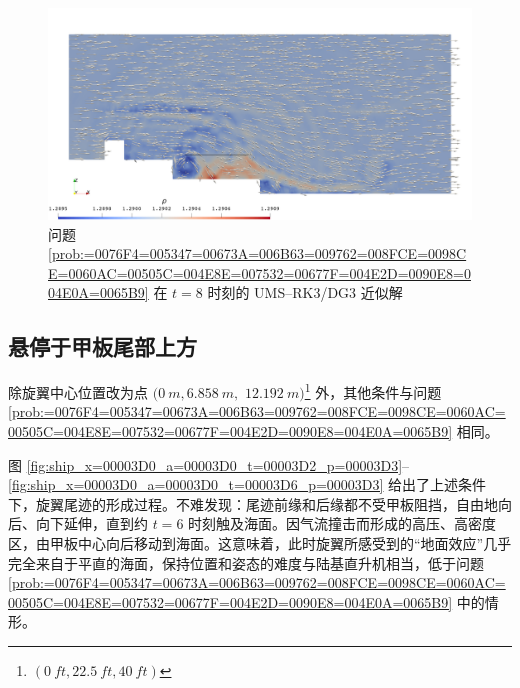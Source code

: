 \begin{figure}[h!]
\begin{centering}
\includegraphics[width=1\textwidth,height=0.4\textheight,keepaspectratio]{figures/ship/a=0_p=3/Frame80}
\par\end{centering}
\caption{\label{fig:ship_a=00003D0_t=00003D8_p=00003D3}问题 \ref{prob:=0076F4=005347=00673A=006B63=009762=008FCE=0098CE=0060AC=00505C=004E8E=007532=00677F=004E2D=0090E8=004E0A=0065B9}
在 $t=8$ 时刻的 UMS–RK3/DG3 近似解}
\end{figure}


\subsection{悬停于甲板尾部上方\label{subsec:x=00003D0_u=00003D5_a=00003D0}}
\begin{problem}
[直升机正面迎风悬停于甲板尾部上方]\label{prob:=0076F4=005347=00673A=006B63=009762=008FCE=0098CE=0060AC=00505C=004E8E=007532=00677F=005C3E=0090E8=004E0A=0065B9}除旋翼中心位置改为点
$(\SI{0}{m},\SI{6.858}{m},$ $\SI{12.192}{m})$\footnote{$(\SI{0}{ft},\SI{22.5}{ft},\SI{40}{ft})$}
外，其他条件与问题 \ref{prob:=0076F4=005347=00673A=006B63=009762=008FCE=0098CE=0060AC=00505C=004E8E=007532=00677F=004E2D=0090E8=004E0A=0065B9}
相同。
\end{problem}

图 \ref{fig:ship_x=00003D0_a=00003D0_t=00003D2_p=00003D3}–\ref{fig:ship_x=00003D0_a=00003D0_t=00003D6_p=00003D3}
给出了上述条件下，旋翼尾迹的形成过程。不难发现：尾迹前缘和后缘都不受甲板阻挡，自由地向后、向下延伸，直到约 $t=6$ 时刻触及海面。因气流撞击而形成的高压、高密度区，由甲板中心向后移动到海面。这意味着，此时旋翼所感受到的“地面效应”几乎完全来自于平直的海面，保持位置和姿态的难度与陆基直升机相当，低于问题
\ref{prob:=0076F4=005347=00673A=006B63=009762=008FCE=0098CE=0060AC=00505C=004E8E=007532=00677F=004E2D=0090E8=004E0A=0065B9}
中的情形。

